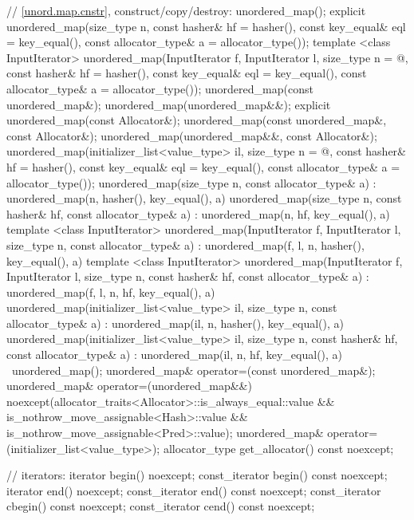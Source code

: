 \begin{codeblock}
{{    // \ref{unord.map.cnstr}, construct/copy/destroy:
    unordered_map();
    explicit unordered_map(size_type n,
                           const hasher& hf = hasher(),
                           const key_equal& eql = key_equal(),
                           const allocator_type& a = allocator_type());
    template <class InputIterator>
      unordered_map(InputIterator f, InputIterator l,
                    size_type n = @\seebelow@,
                    const hasher& hf = hasher(),
                    const key_equal& eql = key_equal(),
                    const allocator_type& a = allocator_type());
    unordered_map(const unordered_map&);
    unordered_map(unordered_map&&);
    explicit unordered_map(const Allocator&);
    unordered_map(const unordered_map&, const Allocator&);
    unordered_map(unordered_map&&, const Allocator&);
    unordered_map(initializer_list<value_type> il,
                  size_type n = @\seebelow@,
                  const hasher& hf = hasher(),
                  const key_equal& eql = key_equal(),
                  const allocator_type& a = allocator_type());
    unordered_map(size_type n, const allocator_type& a)
      : unordered_map(n, hasher(), key_equal(), a) { }
    unordered_map(size_type n, const hasher& hf, const allocator_type& a)
      : unordered_map(n, hf, key_equal(), a) { }
    template <class InputIterator>
      unordered_map(InputIterator f, InputIterator l, size_type n, const allocator_type& a)
        : unordered_map(f, l, n, hasher(), key_equal(), a) { }
    template <class InputIterator>
      unordered_map(InputIterator f, InputIterator l, size_type n, const hasher& hf,
                    const allocator_type& a)
        : unordered_map(f, l, n, hf, key_equal(), a) { }
    unordered_map(initializer_list<value_type> il, size_type n, const allocator_type& a)
      : unordered_map(il, n, hasher(), key_equal(), a) { }
    unordered_map(initializer_list<value_type> il, size_type n, const hasher& hf,
                  const allocator_type& a)
      : unordered_map(il, n, hf, key_equal(), a) { }
    ~unordered_map();
    unordered_map& operator=(const unordered_map&);
    unordered_map& operator=(unordered_map&&)
      noexcept(allocator_traits<Allocator>::is_always_equal::value &&
               is_nothrow_move_assignable<Hash>::value &&
               is_nothrow_move_assignable<Pred>::value);
    unordered_map& operator=(initializer_list<value_type>);
    allocator_type get_allocator() const noexcept;

    // iterators:
    iterator       begin() noexcept;
    const_iterator begin() const noexcept;
    iterator       end() noexcept;
    const_iterator end() const noexcept;
    const_iterator cbegin() const noexcept;
    const_iterator cend() const noexcept;

}}
\end{codeblock}
